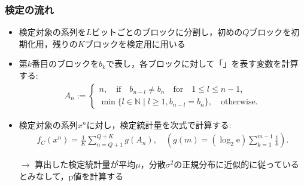 \documentclass[dvipdfmx,11pt]{beamer}
\begin{document}
\begin{frame}[t]\frametitle{検定の流れ}
\begin{itemize}\setlength{\itemsep}{0.5\baselineskip}
  \item 検定対象の系列を$L$ビットごとのブロックに分割し，初めの$Q$ブロックを初期化用，残りの$K$ブロックを検定用に用いる
  \item 第$k$番目のブロックを$b_k$で表し，各ブロックに対して「」を表す変数を計算する:
  \begin{align*}
    A_n := \left\{ \begin{array}{ll}
    n, \quad \mathrm{if} \quad b_{n-l} \neq b_n \quad \mathrm{for} \quad 1 \leq l \leq n-1, \\
    \min \{ l \in \mathbb{N} \mid l \geq 1, b_{n-l} = b_n \},\quad \mathrm{otherwise}.
    \end{array} \right.
  \end{align*}
  \item 検定対象の系列$x^n$に対し，検定統計量を次式で計算する:
  \begin{align*}
    f_C(x^n) = \frac{1}{K}\sum_{n=Q+1}^{Q+K} g(A_n), \quad \left( g(m) = (\log_2\mathrm{e}) \sum_{k=1}^{m-1}\frac{1}{k} \right).
  \end{align*}
  \item[$\to$] 算出した検定統計量が平均$\mu$，分散$\sigma^2$の正規分布に近似的に従っているとみなして，p値を計算する
\end{itemize}
%
\end{frame}
\end{document}
